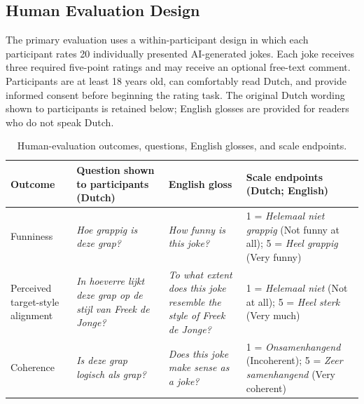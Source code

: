 \documentclass[11pt]{article}
\begin{document}
\subsection{Human Evaluation Design}\label{human-evaluation-design}

The primary evaluation uses a within-participant design in which each participant rates 20 individually presented AI-generated jokes. Each joke receives three required five-point ratings and may receive an optional free-text comment. Participants are at least 18 years old, can comfortably read Dutch, and provide informed consent before beginning the rating task. The original Dutch wording shown to participants is retained below; English glosses are provided for readers who do not speak Dutch.

\begin{table}[t]
\centering
\caption{Human-evaluation outcomes, questions, English glosses, and scale endpoints.}\label{tab:evaluation-outcomes}
\scriptsize\begin{tabularx}{\textwidth}{YYYY}
\toprule\noalign{}
Outcome & Question shown to participants (Dutch) & English gloss & Scale endpoints (Dutch; English) \\
\midrule\noalign{}

Funniness & \emph{Hoe grappig is deze grap?} & \emph{How funny is this joke?} & 1 = \emph{Helemaal niet grappig} (Not funny at all); 5 = \emph{Heel grappig} (Very funny) \\
Perceived target-style alignment & \emph{In hoeverre lijkt deze grap op de stijl van Freek de Jonge?} & \emph{To what extent does this joke resemble the style of Freek de Jonge?} & 1 = \emph{Helemaal niet} (Not at all); 5 = \emph{Heel sterk} (Very much) \\
Coherence & \emph{Is deze grap logisch als grap?} & \emph{Does this joke make sense as a joke?} & 1 = \emph{Onsamenhangend} (Incoherent); 5 = \emph{Zeer samenhangend} (Very coherent) \\
\bottomrule
\end{tabularx}\end{table}
\end{document}
